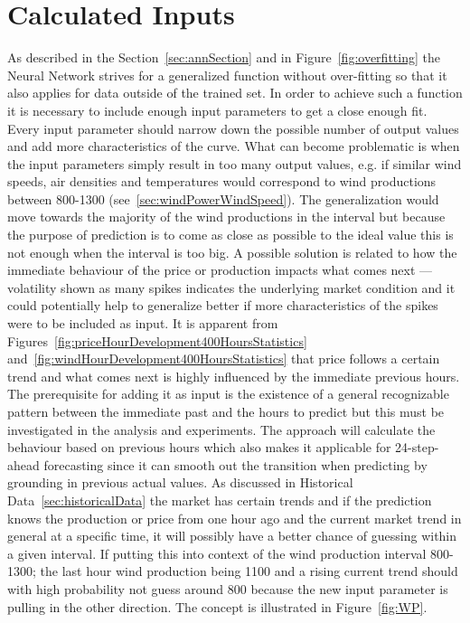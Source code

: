 \section{Calculated Inputs}
\label{sec:usingStatisticalInput}
As described in the Section~\ref{sec:annSection} and in Figure~\ref{fig:overfitting} the Neural Network strives for a generalized function without over-fitting so that it also applies for data outside of the trained set. In order to achieve such a function it is necessary to include enough input parameters to get a close enough fit. Every input parameter should narrow down the possible number of output values and add more characteristics of the curve. What can become problematic is when the input parameters simply result in too many output values, e.g. if similar wind speeds, air densities and temperatures would correspond to wind productions between 800-1300 (see~\ref{sec:windPowerWindSpeed}). The generalization would move towards the majority of the wind productions in the interval but because the purpose of prediction is to come as close as possible to the ideal value this is not enough when the interval is too big. A possible solution is related to how the immediate behaviour of the price or production impacts what comes next --- volatility shown as many spikes indicates the underlying market condition\cite{yamin2004adaptive} and it could potentially help to generalize better if more characteristics of the spikes were to be included as input. It is apparent from Figures~\ref{fig:priceHourDevelopment400HoursStatistics} and~\ref{fig:windHourDevelopment400HoursStatistics} that price follows a certain trend and what comes next is highly influenced by the immediate previous hours. The prerequisite for adding it as input is the existence of a general recognizable pattern between the immediate past and the hours to predict but this must be investigated in the analysis and experiments. The approach will calculate the behaviour based on previous hours which also makes it applicable for 24-step-ahead forecasting since it can smooth out the transition when predicting by grounding in previous actual values. As discussed in Historical Data~\ref{sec:historicalData} the market has certain trends and if the prediction knows the production or price from one hour ago and the current market trend in general at a specific time, it will possibly have a better chance of guessing within a given interval. If putting this into context of the wind production interval 800-1300; the last hour wind production being 1100 and a rising current trend should with high probability not guess around 800 because the new input parameter is pulling in the other direction. The concept is illustrated in Figure~\ref{fig:WP}. 

